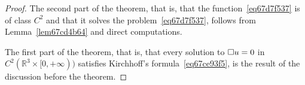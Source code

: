 \documentclass[a4paper,9pt]{amsart}
\newcommand{\R}{\mathbb{R}}	%
\newcommand{\did}{\,\mathrm{d}}	%
\newcommand{\de}{\partial}		%
\newcommand{\laplacian}{\triangle}
\theoremstyle{plain}
\theoremstyle{definition}
\theoremstyle{remark}
\begin{document}
\begin{proof}
	The second part of the theorem, that is, that the function~\eqref{eq67d7f537} is of class $C^2$ and that it solves the problem~\eqref{eq67d7f537}, follows from Lemma~\ref{lem67cd4b64} and direct computations.
	
	The first part of the theorem, that is, that every solution to 
	$\square u =0$ in $C^2(\R^3\times[0,+\infty))$ satisfies Kirchhoff's formula~\eqref{eq67ce93f5}, is the result of the discussion before the theorem.
%	

\end{proof}
\end{document}
